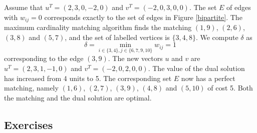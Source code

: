 \documentclass[12pt]{article}
\begin{document}
Assume that $u^T=(2, 3, 0, -2, 0)$ and $v^T=(-2, 0, 3, 0, 0)$. The set $E$
of edges with $w_{ij}=0$ corresponds exactly to the set of edges in
Figure \ref{bipartite}. The maximum cardinality matching algorithm
finds the matching $(1,9)$, $(2,6)$, $(3,8)$ and $(5,7)$, and the set
of labelled vertices is $\{3,4,8\}$. We compute $\delta$ as 
$$ \delta= \min_{i\in\{3,4\}, j\in\{6,7,9,10\}} w_{ij} = 1$$
corresponding to the edge $(3,9)$. The new vectors $u$ and $v$ are
$u^T=(2, 3, 1, -1,0)$ and $v^T=(-2,0,2,0,0)$. The value of the dual
solution has increased from 4 units to 5. The corresponding set
$E$ now has a perfect matching, namely $(1,6)$, $(2,7)$, $(3,9)$,
$(4,8)$ and $(5,10)$ of cost 5. Both the matching and the dual
solution are optimal. 

\subsection*{Exercises}
\end{document}
